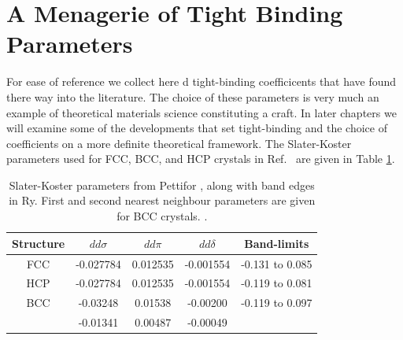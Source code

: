 \section{A Menagerie of Tight Binding Parameters}
For ease of reference we collect here d tight-binding coefficicents
that have found there way into the literature. The choice of these parameters
is very much an example of theoretical materials science constituting a 
craft. In later chapters we will examine some of the developments that set
tight-binding and the choice of coefficients on a more definite 
theoretical framework. The Slater-Koster parameters used for FCC, BCC, 
and HCP crystals in Ref.~\cite{haydock72} are given in Table \ref{tab:pettiparams}.
%
\begin{table}
\begin{center}
\begin{tabular}{|c|c|c|c|c|} 
\hline
Structure & $dd\sigma$ & $dd\pi$  & $dd\delta$ &  Band-limits \\
\hline
FCC       & -0.027784  & 0.012535 & -0.001554  & -0.131 to 0.085 \\ 
\hline
HCP       & -0.027784  & 0.012535 & -0.001554  & -0.119 to 0.081 \\
\hline
BCC       & -0.03248   & 0.01538  & -0.00200   & -0.119 to 0.097 \\
          & -0.01341   & 0.00487  & -0.00049   &              \\
\hline
\end{tabular}
\caption{Slater-Koster parameters from Pettifor \cite{pettifor69}, 
along with band edges in Ry. First and second nearest neighbour 
parameters are given for BCC crystals. \label{tab:pettiparams}.}
\end{center}
\end{table}
%

